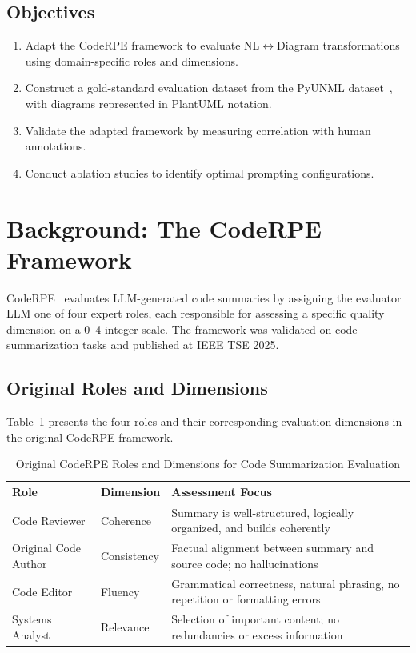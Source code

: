 \documentclass[lettersize,journal]{IEEEtran}
\begin{document}
\subsection{Objectives}

\begin{enumerate}
    \item Adapt the CodeRPE framework to evaluate NL$\leftrightarrow$Diagram transformations using domain-specific roles and dimensions.
    \item Construct a gold-standard evaluation dataset from the PyUNML dataset~\cite{pyunml}, with diagrams represented in PlantUML notation.
    \item Validate the adapted framework by measuring correlation with human annotations.
    \item Conduct ablation studies to identify optimal prompting configurations.
\end{enumerate}

\section{Background: The CodeRPE Framework}
\label{sec:background}

CodeRPE~\cite{wu2025coderpe} evaluates LLM-generated code summaries by assigning the evaluator LLM one of four expert roles, each responsible for assessing a specific quality dimension on a 0--4 integer scale. The framework was validated on code summarization tasks and published at IEEE TSE 2025.

\subsection{Original Roles and Dimensions}

Table~\ref{tab:original-roles} presents the four roles and their corresponding evaluation dimensions in the original CodeRPE framework.

\begin{table}[!t]
\centering
\caption{Original CodeRPE Roles and Dimensions for Code Summarization Evaluation}
\label{tab:original-roles}
\begin{tabular}{@{}p{2.2cm}p{1.8cm}p{3.5cm}@{}}
\toprule
\textbf{Role} & \textbf{Dimension} & \textbf{Assessment Focus} \\
\midrule
Code Reviewer & Coherence & Summary is well-structured, logically organized, and builds coherently \\
\addlinespace
Original Code Author & Consistency & Factual alignment between summary and source code; no hallucinations \\
\addlinespace
Code Editor & Fluency & Grammatical correctness, natural phrasing, no repetition or formatting errors \\
\addlinespace
Systems Analyst & Relevance & Selection of important content; no redundancies or excess information \\
\bottomrule
\end{tabular}
\end{table}
\end{document}
